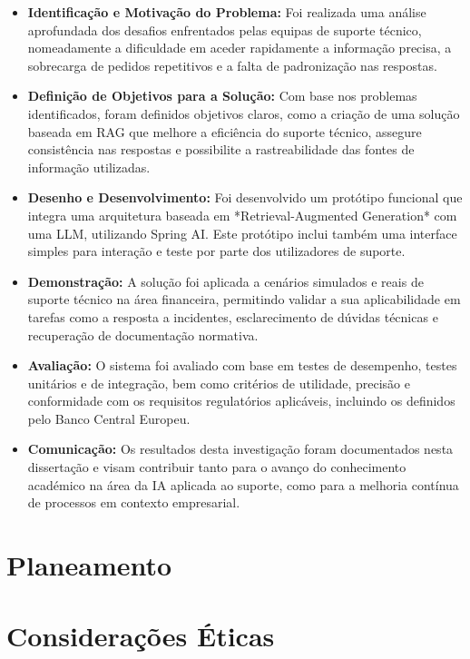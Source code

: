 \begin{itemize}
\item \textbf{Identificação e Motivação do Problema:} Foi realizada uma análise aprofundada dos desafios enfrentados pelas equipas de suporte técnico, nomeadamente a dificuldade em aceder rapidamente a informação precisa, a sobrecarga de pedidos repetitivos e a falta de padronização nas respostas.
\item \textbf{Definição de Objetivos para a Solução:} Com base nos problemas identificados, foram definidos objetivos claros, como a criação de uma solução baseada em RAG que melhore a eficiência do suporte técnico, assegure consistência nas respostas e possibilite a rastreabilidade das fontes de informação utilizadas.

\item \textbf{Desenho e Desenvolvimento:} Foi desenvolvido um protótipo funcional que integra uma arquitetura baseada em *Retrieval-Augmented Generation* com uma LLM, utilizando Spring AI. Este protótipo inclui também uma interface simples para interação e teste por parte dos utilizadores de suporte.

\item \textbf{Demonstração:} A solução foi aplicada a cenários simulados e reais de suporte técnico na área financeira, permitindo validar a sua aplicabilidade em tarefas como a resposta a incidentes, esclarecimento de dúvidas técnicas e recuperação de documentação normativa.

\item \textbf{Avaliação:} O sistema foi avaliado com base em testes de desempenho, testes unitários e de integração, bem como critérios de utilidade, precisão e conformidade com os requisitos regulatórios aplicáveis, incluindo os definidos pelo Banco Central Europeu.

\item \textbf{Comunicação:} Os resultados desta investigação foram documentados nesta dissertação e visam contribuir tanto para o avanço do conhecimento académico na área da IA aplicada ao suporte, como para a melhoria contínua de processos em contexto empresarial.

\end{itemize}




\section{Planeamento}


\section{Considerações Éticas}

